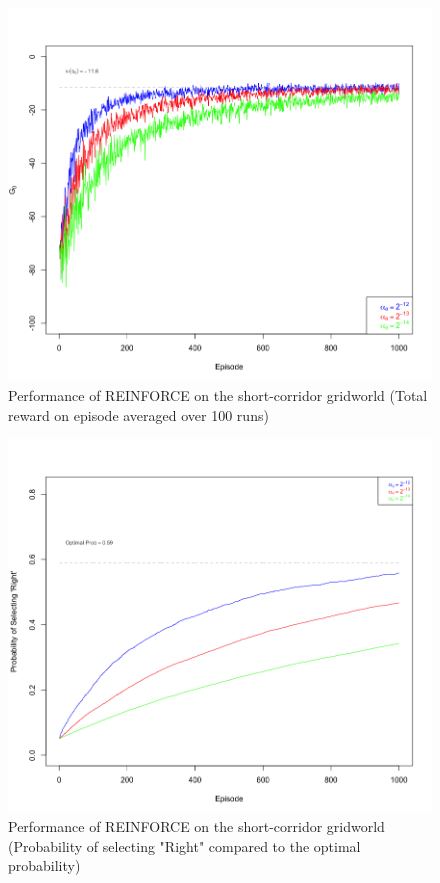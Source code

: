 \documentclass[a4paper,12pt]{article}
\begin{document}
\begin{figure}[H]
  \caption{Performance of REINFORCE on the short-corridor gridworld (Total reward on episode averaged over 100 runs)}
  \centering
  \includegraphics[width=12cm]{figures/2d1.png}
\end{figure}

\begin{figure}[H]
  \caption{Performance of REINFORCE on the short-corridor gridworld (Probability of selecting "Right" compared to the optimal probability)}
  \centering
  \includegraphics[width=12cm]{figures/2d2.png}
\end{figure}
\end{document}
